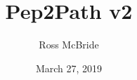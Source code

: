 \documentclass{l4proj}
\begin{document}
\title{Pep2Path v2}
\author{Ross McBride}
\date{March 27, 2019}

\maketitle

\begin{abstract}
\end{abstract}


%
%
\def\consentname {Ross McBride} %
\def\consentdate {27 March 2019} %
%
\educationalconsent


\tableofcontents

%
%
%
%
%
%
%
\end{document}
